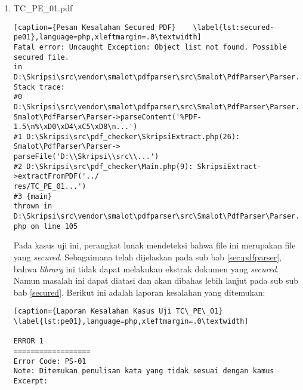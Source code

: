 \begin{enumerate}
	\item TC\_PE\_01.pdf
	
\begin{lstlisting}[caption={Pesan Kesalahan Secured PDF}	\label{lst:secured-pe01},language=php,xleftmargin=.0\textwidth]
Fatal error: Uncaught Exception: Object list not found. Possible secured file. 
in D:\Skripsi\src\vendor\smalot\pdfparser\src\Smalot\PdfParser\Parser.php:105
Stack trace:
#0 D:\Skripsi\src\vendor\smalot\pdfparser\src\Smalot\PdfParser\Parser.php(81): 
Smalot\PdfParser\Parser->parseContent('%PDF-1.5\n%\xD0\xD4\xC5\xD8\n...')
#1 D:\Skripsi\src\pdf_checker\SkripsiExtract.php(26): Smalot\PdfParser\Parser->
parseFile('D:\\Skripsi\\src\\...')
#2 D:\Skripsi\src\pdf_checker\Main.php(9): SkripsiExtract->extractFromPDF('../
res/TC_PE_01...')
#3 {main}
thrown in D:\Skripsi\src\vendor\smalot\pdfparser\src\Smalot\PdfParser\Parser.
php on line 105
\end{lstlisting}

	Pada kasus uji ini, perangkat lunak mendeteksi bahwa file ini merupakan file yang \textit{secured}. Sebagaimana telah dijelaskan pada sub bab \ref{sec:pdfparser}, bahwa \textit{library} ini tidak dapat melakukan ekstrak dokumen yang \textit{secured}. Namun masalah ini dapat diatasi dan akan dibahas lebih lanjut pada sub sub bab \ref{secured}. Berikut ini adalah laporan kesalahan yang ditemukan:

\begin{lstlisting}[caption={Laporan Kesalahan Kasus Uji TC\_PE\_01}	\label{lst:pe01},language=php,xleftmargin=.0\textwidth]

ERROR 1
==================
Error Code: PS-01
Note: Ditemukan penulisan kata yang tidak sesuai dengan kamus
Excerpt: 


\end{lstlisting}
\end{enumerate}

